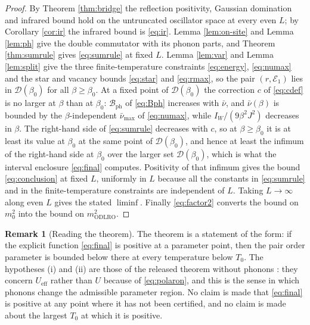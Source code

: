 \documentclass[11pt]{article}
\numberwithin{equation}{section}
\newcommand{\ph}{\mathrm{ph}}
\newcommand{\eff}{\mathrm{eff}}
\newcommand{\ODLRO}{\mathrm{ODLRO}}
\theoremstyle{definition}
\newtheorem{remark}[theorem]{Remark}
\begin{document}
\begin{proof}
By Theorem \ref{thm:bridge} the reflection positivity, Gaussian domination and infrared
bound hold on the untruncated oscillator space at every even $L$; by Corollary
\ref{cor:ir} the infrared bound is \eqref{eq:ir}. Lemma \ref{lem:on-site} and Lemma \ref{lem:ph}
give the double commutator with its phonon parts, and Theorem \ref{thm:sumrule} gives
\eqref{eq:sumrule} at fixed $L$. Lemma \ref{lem:var} and Lemma \ref{lem:split} give the three
finite-temperature constraints \eqref{eq:energy}, \eqref{eq:numax} and the star and
vacancy bounds \eqref{eq:star} and \eqref{eq:rmax}, so the pair
$(r,\mathcal{E}_{1})$ lies in $\mathcal{D}(\beta_0)$ for all $\beta\ge\beta_0$. At a
fixed point of $\mathcal{D}(\beta_0)$ the correction $c$ of \eqref{eq:cdef} is no larger at
$\beta$ than at $\beta_0$: $\mathcal{B}_{\ph}$ of \eqref{eq:Bph} increases with
$\bar\nu$, and $\bar\nu(\beta)$ is bounded by the $\beta$-independent $\bar\nu_{\max}$
of \eqref{eq:numax}, while $I_{W}/(9\beta^{2}J^{2})$ decreases in $\beta$. The right-hand
side of \eqref{eq:sumrule} decreases with $c$, so at $\beta\ge\beta_0$ it is at least its
value at $\beta_0$ at the same point of $\mathcal{D}(\beta_0)$, and hence at least the
infimum of the right-hand side at $\beta_0$ over the larger set $\mathcal{D}(\beta_0)$,
which is what the interval enclosure \eqref{eq:final} computes. Positivity of that infimum gives the bound \eqref{eq:conclusion} at fixed $L$,
uniformly in $L$ because all the constants in \eqref{eq:sumrule} and in the
finite-temperature constraints are independent of $L$. Taking
$L\to\infty$ along even $L$ gives the stated $\liminf$. Finally \eqref{eq:factor2} converts the bound
on $m_{0}^{2}$ into the bound on $m^{2}_{\ODLRO}$.
\end{proof}

\begin{remark}[Reading the theorem]\label{rem:reading}
The theorem is a statement of the form: if the explicit function \eqref{eq:final} is positive at a
parameter point, then the pair order parameter is bounded below there at every
temperature below $T_0$. The hypotheses (i) and (ii) are those of the released theorem
without phonons \cite{rens2026pkodlro}: they concern $U_{\eff}$ rather than $U$ because
of \eqref{eq:polaron}, and this is the sense in which phonons change the admissible parameter region.
No claim is made that \eqref{eq:final} is positive at any point where it has not been certified, and
no claim is made about the largest $T_0$ at which it is positive.
\end{remark}
\end{document}
